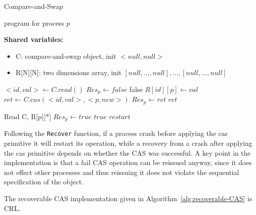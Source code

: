 \begin{varalgorithm}{Compare-and-Swap}
	\caption{program for process $p$}
	\label{alg:recoverable-CAS}
	
	\hspace*{\algorithmicindent} \textbf{Shared variables:}
	\begin{itemize}[noitemsep,topsep=0pt]
		\item C: compare-and-swap object, init $<null,null>$
		\item R[N][N]: two dimensions array, init $[null,\ldots,null],\ldots,[null,\ldots,null]$
	\end{itemize}

	\begin{multicols}{2}
	\begin{algorithmic}[1]
		\State $<id,val> \gets C.read()$
		\State $Res_p \gets false$
		\State \Return false
		\EndIf
  		\State $R[id][p] \gets val$
		\EndIf
		\State $ret \gets C.cas(<id,val>, <p,new>)$
		\State $Res_p \gets ret$
		\State \Return $ret$
		\EndProcedure
		
		\columnbreak
		
		\State Read C, R[p][$*$]
		\State $Res_p \gets true$
		\State \Return $true$
		\Else {}
		\State \Return $restart$
		\EndIf
		\EndProcedure
	\end{algorithmic}
\end{multicols}
\end{varalgorithm}


Following the \texttt{Recover} function, if a process crash before applying the cas primitive it will restart its operation, while a recovery from a crash after applying the cas primitive depends on whether the CAS was successful. A key point in the implementation is that a fail CAS operation can be reissued anyway, since it does not effect other processes and thus reissuing it does not violate the sequential specification of the object.

\begin{claim}
	The recoverable CAS implementation given in Algorithm~\ref{alg:recoverable-CAS} is CRL.
\end{claim}

